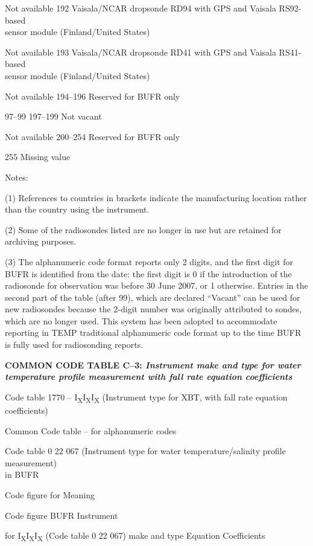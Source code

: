 Not available 192 Vaisala/NCAR dropsonde RD94 with GPS and Vaisala RS92-based\\
sensor module (Finland/United States)

Not available 193 Vaisala/NCAR dropsonde RD41 with GPS and Vaisala RS41-based\\
sensor module (Finland/United States)

Not available 194--196 Reserved for BUFR only

97--99 197--199 Not vacant

Not available 200--254 Reserved for BUFR only

255 Missing value

Notes:

(1) References to countries in brackets indicate the manufacturing location rather than the country using the instrument.

(2) Some of the radiosondes listed are no longer in use but are retained for archiving purposes.

(3) The alphanumeric code format reports only 2 digits, and the first digit for BUFR is identified from the date: the first digit is 0 if the introduction of the radiosonde for observation was before 30 June 2007, or 1 otherwise. Entries in the second part of the table (after 99), which are declared ``Vacant'' can be used for new radiosondes because the 2-digit number was originally attributed to sondes, which are no longer used. This system has been adopted to accommodate reporting in TEMP traditional alphanumeric code format up to the time BUFR is fully used for radiosonding reports.

\textbf{COMMON CODE TABLE C--3: \emph{Instrument make and type for water temperature profile measurement with fall rate equation coefficients}}

Code table 1770 -- I\textsubscript{X}I\textsubscript{X}I\textsubscript{X} (Instrument type for XBT, with fall rate equation coefficients)

Common Code table -- for alphanumeric codes

Code table 0 22 067 (Instrument type for water temperature/salinity profile measurement)\\
in BUFR

Code figure for Meaning

Code figure BUFR Instrument

for I\textsubscript{X}I\textsubscript{X}I\textsubscript{X} (Code table 0 22 067) make and type Equation Coefficients


